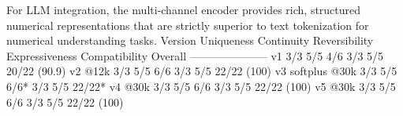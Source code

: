  For LLM integration, the multi-channel encoder provides rich, structured numerical representations that are strictly superior to text tokenization for numerical understanding tasks.\markdownRendererOlItemEnd 
\markdownRendererOlEndTight \markdownRendererInterblockSeparator
{}\markdownRendererThematicBreak{}\markdownRendererInterblockSeparator
{}
\markdownRendererSectionEnd 
\markdownRendererSectionEnd \markdownRendererSectionBegin
{}\markdownRendererInterblockSeparator
{}\markdownRendererPipe{} Version \markdownRendererPipe{} Uniqueness \markdownRendererPipe{} Continuity \markdownRendererPipe{} Reversibility \markdownRendererPipe{} Expressiveness \markdownRendererPipe{} Compatibility \markdownRendererPipe{} Overall \markdownRendererPipe{}\markdownRendererSoftLineBreak
{}\markdownRendererPipe{}---\markdownRendererPipe{}---\markdownRendererPipe{}---\markdownRendererPipe{}---\markdownRendererPipe{}---\markdownRendererPipe{}---\markdownRendererPipe{}---\markdownRendererPipe{}\markdownRendererSoftLineBreak
{}\markdownRendererPipe{} v1 \markdownRendererPipe{} 3/3 \markdownRendererPipe{} 5/5 \markdownRendererPipe{} 4/6 \markdownRendererPipe{} 3/3 \markdownRendererPipe{} 5/5 \markdownRendererPipe{} 20/22 (90.9\markdownRendererPercentSign{}) \markdownRendererPipe{}\markdownRendererSoftLineBreak
{}\markdownRendererPipe{} v2 @12k \markdownRendererPipe{} 3/3 \markdownRendererPipe{} 5/5 \markdownRendererPipe{} 6/6 \markdownRendererPipe{} 3/3 \markdownRendererPipe{} 5/5 \markdownRendererPipe{} 22/22 (100\markdownRendererPercentSign{}) \markdownRendererPipe{}\markdownRendererSoftLineBreak
{}\markdownRendererPipe{} v3 softplus @30k \markdownRendererPipe{} 3/3 \markdownRendererPipe{} 5/5 \markdownRendererPipe{} 6/6* \markdownRendererPipe{} 3/3 \markdownRendererPipe{} 5/5 \markdownRendererPipe{} 22/22* \markdownRendererPipe{}\markdownRendererSoftLineBreak
{}\markdownRendererPipe{} v4 @30k \markdownRendererPipe{} 3/3 \markdownRendererPipe{} 5/5 \markdownRendererPipe{} 6/6 \markdownRendererPipe{} 3/3 \markdownRendererPipe{} 5/5 \markdownRendererPipe{} 22/22 (100\markdownRendererPercentSign{}) \markdownRendererPipe{}\markdownRendererSoftLineBreak
{}\markdownRendererPipe{} v5 @30k \markdownRendererPipe{} 3/3 \markdownRendererPipe{} 5/5 \markdownRendererPipe{} 6/6 \markdownRendererPipe{} 3/3 \markdownRendererPipe{} 5/5 \markdownRendererPipe{} 22/22 (100\markdownRendererPercentSign{}) \markdownRendererPipe{}\markdownRendererSoftLineBreak
